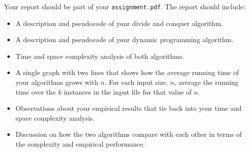 \documentclass{article}
\begin{document}
Your report should be part of your \texttt{assignment.pdf}. The report should include:
\begin{itemize}
\item A description and pseudocode of your divide and conquer algorithm.
\item A description and pseudocode of your dynamic programming algorithm.
\item Time and space complexity analysis of both algorithms.
\item A single graph with two lines that shows how the average running time of
your algorithms grows with $n$. For each input size, $n$, average the running
time over the $k$ instances in the input file for that value of $n$.
\item Observations about your empirical results that tie back into your time
and space complexity analysis.
\item Discussion on how the two algorithms compare with each other in terms of
the complexity and empirical performance.
\end{itemize}
\end{document}
